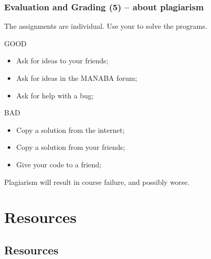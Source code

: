 \documentclass{beamer}
\begin{document}
\begin{frame}
  \frametitle{Evaluation and Grading (5) -- about plagiarism}

  The assignments are \alert{individual}. Use your  to solve the programs.

  \begin{exampleblock}{GOOD}
    \begin{itemize}
    \item Ask for ideas to your friends;
    \item Ask for ideas in the MANABA forum;
    \item Ask for help with a bug;
    \end{itemize}
  \end{exampleblock}

  \begin{alertblock}{BAD}
    \begin{itemize}
    \item Copy a solution from the internet;
    \item Copy a solution from your friends;
    \item Give your code to a friend;
    \end{itemize}
  \end{alertblock}

  Plagiarism will result in course failure, and possibly worse.
\end{frame}

\section{Resources}
\subsection{Resources}
\end{document}
